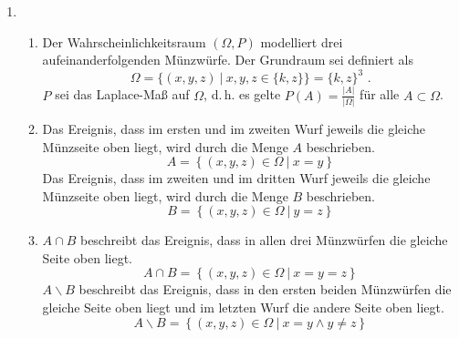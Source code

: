 \documentclass[a4paper]{scrartcl}
\begin{document}
\begin{enumerate}[label=\bfseries\arabic*.]
\begin{enumerate}[label=(\alph*)]
        \end{enumerate}

    \item
        \begin{enumerate}[label=(\alph*)]
            \item
                Der Wahrscheinlichkeitsraum $(\Omega, P)$ modelliert drei
                aufeinanderfolgenden Münzwürfe.
                Der Grundraum sei definiert als
                \begin{equation}
                    \Omega = \Big\{
                        (x, y, z) \ \vert\  x, y, z \in \{k, z\}
                    \Big\}
                    = \{k, z\}^3
                    \text{ .}
                \end{equation}
                $P$ sei das Laplace-Maß auf $\Omega$, d.\,h. es gelte
                $P(A) = \frac{|A|}{|\Omega|}$ für alle $A \subset \Omega$.

            \item
                Das Ereignis, dass im ersten und im zweiten Wurf jeweils die
                gleiche Münzseite oben liegt, wird durch die Menge $A$
                beschrieben.
                \begin{equation}
                    A = \left\{
                        (x, y, z) \in \Omega \ \vert \ 
                        x = y
                    \right\}
                \end{equation}
                Das Ereignis, dass im zweiten und im dritten Wurf jeweils die
                gleiche Münzseite oben liegt, wird durch die Menge $B$
                beschrieben.
                \begin{equation}
                    B = \left\{
                        (x, y, z) \in \Omega \ \vert \ 
                        y = z
                    \right\}
                \end{equation}

            \item
                $A \cap B$  beschreibt das Ereignis, dass in allen drei
                Münzwürfen die gleiche Seite oben liegt.
                \begin{equation}
                    A \cap B = \left\{
                        (x, y, z) \in \Omega \ \vert \ 
                        x = y = z
                    \right\}
                \end{equation}
                $A \backslash B$ beschreibt das Ereignis, dass in den ersten
                beiden Münzwürfen die gleiche Seite oben liegt und im letzten
                Wurf die andere Seite oben liegt.
                \begin{equation}
                    A \backslash B = \left\{
                        (x, y, z) \in \Omega \ \vert \ 
                        x = y \land y \neq z
                    \right\}
                \end{equation}


\end{enumerate}
\end{enumerate}
\end{document}

